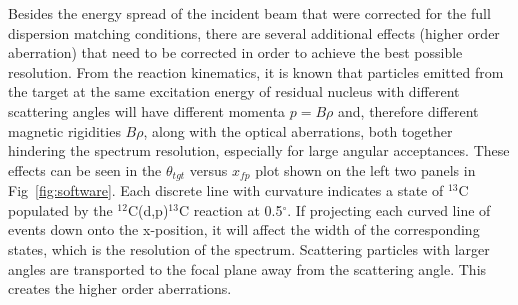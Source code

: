 Besides the energy spread of the incident beam  that were corrected for the full dispersion matching conditions, there are several additional effects (higher order aberration) that need to be corrected  in order to achieve the best possible resolution.
From the reaction kinematics, it is known that particles emitted from the target at the same excitation energy of residual nucleus with different scattering angles will have different momenta $p = B\rho$ and, therefore different  magnetic rigidities $B\rho$, along with the optical aberrations,  both together hindering the spectrum resolution, especially for large angular acceptances.
These effects can be seen in the $\theta_{tgt}$ versus $x_{fp}$ plot shown on the left two panels in Fig~\ref{fig:software}. Each discrete line with curvature indicates a  state of $^{13}$C populated by the $^{12}$C(d,p)$^{13}$C reaction at 0.5$^\circ$. If projecting each curved line of events down onto the x-position, it will affect the width of the corresponding states, which is the resolution of the spectrum. Scattering particles  with larger angles are transported to the focal plane away from the scattering angle.  This creates the higher order aberrations.

